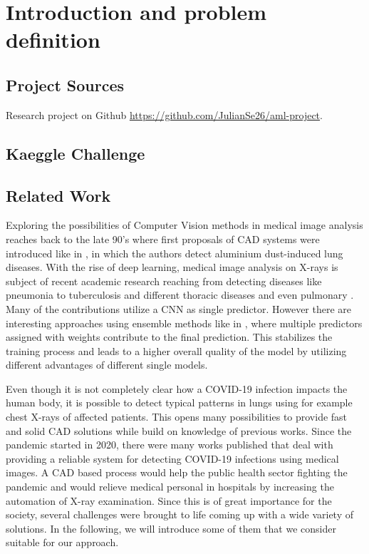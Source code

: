 

\chapter{Introduction and problem definition}\label{chapter:intro}

\section*{Project Sources}
Research project on Github \url{https://github.com/JulianSe26/aml-project}.

\section{Kaeggle Challenge}

\section{Related Work}
Exploring the possibilities of Computer Vision methods in medical image analysis reaches back to the late 90's where first proposals of \ac{CAD} systems were  introduced like in \autocite{kraus2000aluminium}, in which the authors detect aluminium dust-induced lung diseases.
With the rise of deep learning, medical image analysis on X-rays is subject of recent academic research reaching from detecting diseases like pneumonia \autocite{pneumoniaDetection} \autocite{pneumoniaDetection2} \autocite{gupta2019evolutionary} to tuberculosis and different thoracic diseases \autocite{jangam2021deep} and even pulmonary \autocite{vieira2021detecting}. Many of the contributions utilize a \ac{CNN} as single predictor. However there are interesting approaches using ensemble methods like in \autocite{livieris2019weighted}, where multiple predictors assigned with weights contribute to the final prediction. This stabilizes the training process and leads to a higher overall quality of the model by utilizing different advantages of different single models.

Even though it is not completely clear how a COVID-19 infection impacts the human body, it is possible to detect typical patterns in lungs using for example chest X-rays of affected patients. This opens many possibilities to provide fast and solid \ac{CAD} solutions while build on knowledge of previous works.
Since the pandemic started in 2020, there were many works published that deal with providing a reliable system for detecting COVID-19 infections using medical images. A \ac{CAD} based process would help the public health sector fighting the pandemic and would relieve medical personal in hospitals by increasing the automation of X-ray examination. Since this is of great importance for the society, several challenges were brought to life coming up with a wide variety of solutions. In the following, we will introduce some of them that we consider suitable for our approach.

